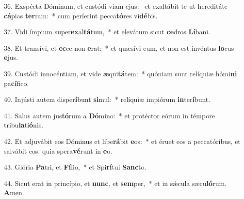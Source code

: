 36. Exspécta Dóminum, et custódi viam ejus: \dag\  et exaltábit te ut hereditáte \textbf{cá}pias \textbf{ter}ram:~*  cum períerint pecca\textbf{tó}res vi\textbf{dé}bis.\

37. Vidi ímpium super\textbf{ex}al\textbf{tá}tum,~*  et elevátum sicut \textbf{ce}dros \textbf{Lí}bani.\

38. Et transívi, et \textbf{ec}ce non \textbf{e}rat:~*  et quæsívi eum, et non est invéntus \textbf{lo}cus \textbf{e}jus.\

39. Custódi innocéntiam, et vide \textbf{æ}qui\textbf{tá}tem:~*  quóniam sunt relíquiæ hómi\textbf{ni} pa\textbf{cí}fico.\

40. Injústi autem disper\textbf{í}bunt \textbf{si}mul:~*  relíquiæ impiórum \textbf{in}ter\textbf{í}bunt.\

41. Salus autem jus\textbf{tó}rum a \textbf{Dó}mino:~*  et protéctor eórum in témpore tribu\textbf{la}ti\textbf{ó}nis.\

42. Et adjuvábit eos Dóminus et libe\textbf{rá}bit \textbf{e}os:~*  et éruet eos a peccatóribus, et salvábit eos: quia spera\textbf{vé}runt in \textbf{e}o.\

43. Glória \textbf{Pa}tri, et \textbf{Fí}lio,~*  et Spi\textbf{rí}tui \textbf{Sanc}to.\

44. Sicut erat in princípio, et \textbf{nunc}, et \textbf{sem}per,~*  et in sǽcula sæcu\textbf{ló}rum. \textbf{A}men.\

